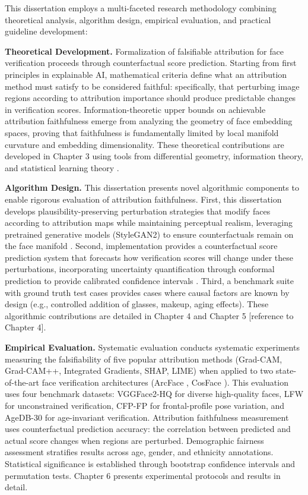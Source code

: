This dissertation employs a multi-faceted research methodology combining theoretical analysis, algorithm design, empirical evaluation, and practical guideline development:

\textbf{Theoretical Development.} Formalization of falsifiable attribution for face verification proceeds through counterfactual score prediction. Starting from first principles in explainable AI, mathematical criteria define what an attribution method must satisfy to be considered faithful: specifically, that perturbing image regions according to attribution importance should produce predictable changes in verification scores. Information-theoretic upper bounds on achievable attribution faithfulness emerge from analyzing the geometry of face embedding spaces, proving that faithfulness is fundamentally limited by local manifold curvature and embedding dimensionality. These theoretical contributions are developed in Chapter 3 using tools from differential geometry, information theory, and statistical learning theory \cite{cover2006information,bengio2013manifold}.

\textbf{Algorithm Design.} This dissertation presents novel algorithmic components to enable rigorous evaluation of attribution faithfulness. First, this dissertation develops plausibility-preserving perturbation strategies that modify faces according to attribution maps while maintaining perceptual realism, leveraging pretrained generative models (StyleGAN2) to ensure counterfactuals remain on the face manifold \cite{karras2020stylegan2}. Second, implementation provides a counterfactual score prediction system that forecasts how verification scores will change under these perturbations, incorporating uncertainty quantification through conformal prediction to provide calibrated confidence intervals \cite{shafer2008conformal,angelopoulos2021conformal}. Third, a benchmark suite with ground truth test cases provides cases where causal factors are known by design (e.g., controlled addition of glasses, makeup, aging effects). These algorithmic contributions are detailed in Chapter 4 and Chapter 5 [reference to Chapter 4].

\textbf{Empirical Evaluation.} Systematic evaluation conducts systematic experiments measuring the falsifiability of five popular attribution methods (Grad-CAM, Grad-CAM++, Integrated Gradients, SHAP, LIME) when applied to two state-of-the-art face verification architectures (ArcFace \cite{deng2019arcface}, CosFace \cite{wang2018cosface}). This evaluation uses four benchmark datasets: VGGFace2-HQ \cite{cao2018vggface2} for diverse high-quality faces, LFW \cite{huang2007lfw} for unconstrained verification, CFP-FP \cite{sengupta2016cfp} for frontal-profile pose variation, and AgeDB-30 \cite{moschoglou2017agedb} for age-invariant verification. Attribution faithfulness measurement uses counterfactual prediction accuracy: the correlation between predicted and actual score changes when regions are perturbed. Demographic fairness assessment stratifies results across age, gender, and ethnicity annotations. Statistical significance is established through bootstrap confidence intervals and permutation tests. Chapter 6 presents experimental protocols and results in detail.

